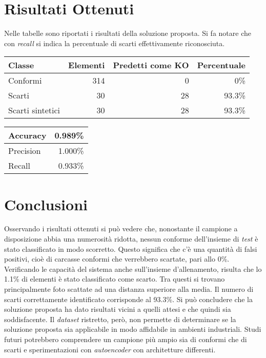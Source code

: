 \documentclass[a0,portrait]{a0poster}
\begin{document}
\begin{multicols}{2}
\section*{Risultati Ottenuti}
Nelle tabelle sono riportati i risultati della soluzione proposta.
Si fa notare che con \textit{recall} si indica la percentuale di scarti effettivamente riconosciuta.
\\
[1cm]
\begin{minipage}[c]{0.37\textwidth}
  \begin{tabular}{||l r r r||}
    \hline
    Classe           & Elementi & Predetti come KO & Percentuale \\ \hline \hline
    Conformi         & 314      & 0                & 0\%         \\ \hline
    Scarti           & 30       & 28               & 93.3\%      \\ \hline
    Scarti sintetici & 30       & 28               & 93.3\%      \\ \hline
  \end{tabular}
\end{minipage}
\begin{minipage}[c]{0.20\textwidth}
  \begin{tabular}{||l r||}
    \hline
    Accuracy  & 0.989\% \\ \hline
    Precision & 1.000\% \\ \hline
    Recall    & 0.933\% \\ \hline
  \end{tabular}
\end{minipage}

\color{SaddleBrown} %
\section*{Conclusioni}
Osservando i risultati ottenuti si può vedere che, nonostante il campione a disposizione abbia una numerosità ridotta, nessun conforme dell'insieme di \textit{test} è stato classificato in modo scorretto.
Questo significa che c'è una quantità di falsi positivi, cioè di carcasse conformi che verrebbero scartate, pari allo 0\%.
Verificando le capacità del sistema anche sull'insieme d'allenamento, risulta che lo 1.1\% di elementi è stato classificato come scarto.
Tra questi si trovano principalmente foto scattate ad una distanza superiore alla media.
Il numero di scarti correttamente identificato corrisponde al 93.3\%.
Si può concludere che la soluzione proposta ha dato risultati vicini a quelli attesi e che quindi sia soddisfacente.
Il \textit{dataset} ristretto, però, non permette di determinare se la soluzione proposta sia applicabile in modo affidabile in ambienti industriali.
Studi futuri potrebbero comprendere un campione più ampio sia di conformi che di scarti e sperimentazioni con \textit{autoencoder} con architetture differenti.

\end{multicols}
\end{document}
